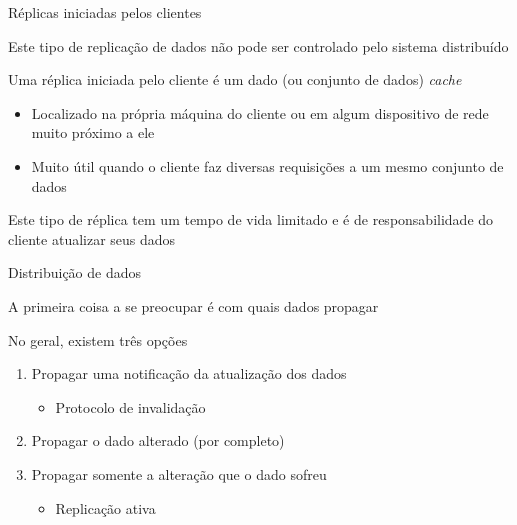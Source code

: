 \documentclass[compress]{beamer}
\begin{document}

\begin{frame}{Réplicas iniciadas pelos clientes}

Este tipo de replicação de dados não pode ser controlado pelo sistema distribuído

\vspace{0.5cm}

Uma réplica iniciada pelo cliente é um dado (ou conjunto de dados) \textit{cache}
\begin{itemize}
    \item Localizado na própria máquina do cliente ou em algum dispositivo de rede muito próximo a ele
    \item Muito útil quando o cliente faz diversas requisições a um mesmo conjunto de dados
\end{itemize}

\vspace{0.5cm}

Este tipo de réplica tem um tempo de vida limitado e é de responsabilidade do cliente atualizar seus dados
\end{frame}


\begin{frame}{Distribuição de dados}

A primeira coisa a se preocupar é com quais dados propagar

\vspace{0.5cm}

No geral, existem três opções
\begin{enumerate}
    \item Propagar uma notificação da atualização dos dados 
    \begin{itemize}
        \item Protocolo de invalidação
    \end{itemize}
    \item Propagar o dado alterado (por completo)
    \item Propagar somente a alteração que o dado sofreu \begin{itemize}
        \item Replicação ativa
    \end{itemize}
\end{enumerate}

\end{frame}
\end{document}
